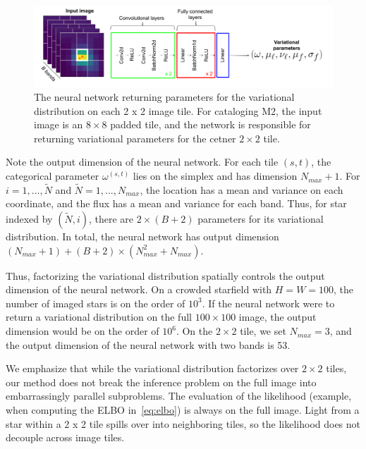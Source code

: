 \begin{figure}[!tb]
    \centering
    \includegraphics[width=\textwidth]{figures/starnet_archetecture3.png}
    \vspace{-0.5cm}
    \caption{The neural network returning parameters for the variational distribution on each 2 x 2 image tile. For cataloging M2, the input image is an $8\times 8$ padded tile, and the network is responsible for returning variational parameters for the cetner $2\times 2$ tile. }
    \label{fig:starnet_arch}
\end{figure}

Note the output dimension of the neural network. For each tile $(s,t)$, the categorical parameter $\omega^{(s,t)}$
lies on the simplex and has dimension $N_{max} + 1$. 
For $i = 1, ..., \tilde N$ and $\tilde N = 1, ..., N_{max}$, the location has a mean and variance on each coordinate, and the flux has a mean and variance for each band. Thus, for star indexed by $(\tilde N, i)$, 
there are $2 \times (B + 2)$ parameters for its variational distribution. In total, the neural network has output dimension $(N_{max} + 1) + (B + 2) \times (N_{max}^2 + N_{max})$. 


Thus, factorizing the variational distribution spatially controls the output dimension of the neural network. On a crowded starfield with $H = W = 100$, the number of imaged stars is on the order of $10^3$. If the neural network were to return a variational distribution on the full $100\times 100$ image, the output dimension would be on the order of $10^6$. 
On the $2\times 2$ tile, we set $N_{max} = 3$, and the output dimension of the neural network with two bands is 53. 

We emphasize that while the variational distribution factorizes over $2 \times 2$ tiles, our method does not break the inference problem on the full image into embarrassingly parallel subproblems. The evaluation of the likelihood (example, when computing the ELBO in~\eqref{eq:elbo}) is always on the full image. Light from a star within a 2 x 2 tile spills over into neighboring tiles, so the likelihood does not decouple across image tiles. 

